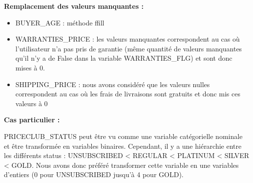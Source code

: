 \textbf{Remplacement des valeurs manquantes :}

\begin{itemize}
\item  BUYER_AGE : méthode ffill
\item WARRANTIES_PRICE : les valeurs manquantes correspondent au cas où l'utilisateur n'a 
pas pris de garantie (même quantité de valeurs manquantes qu'il n'y a de False dans la 
variable WARRANTIES_FLG) et sont donc mises à 0.
\item  SHIPPING_PRICE : nous avons considéré que les valeurs nulles correspondent au cas
où les frais de livraisons sont gratuits et donc mis ces valeurs à 0
\end{itemize}

\textbf{Cas particulier :}

PRICECLUB_STATUS peut être vu comme une variable catégorielle nominale et être transformée
en variables binaires. Cependant, il y a une hiérarchie entre les différents 
status : UNSUBSCRIBED < REGULAR < PLATINUM < SILVER < GOLD. Nous avons donc préféré transformer
cette variable en une variables d'entiers (0 pour UNSUBSCRIBED jusqu'à 4 pour GOLD).




